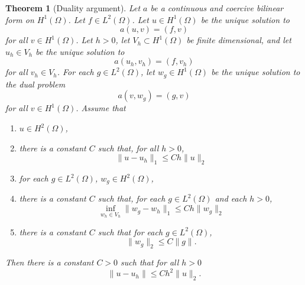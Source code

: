\documentclass{article}
\theoremstyle{plain}
\newtheorem{theorem}{Theorem}
\begin{document}
\begin{theorem}[Duality argument]
	Let $a$ be a continuous and coercive bilinear form on $H^1(\Omega)$.
	Let $f \in L^2(\Omega)$.
	Let $u \in H^1(\Omega)$ be the unique solution to
	\[a(u,v) = (f,v)\]
	for all $v\in H^1(\Omega)$.
	Let $h > 0$, let $V_h \subset H^1(\Omega)$ be finite dimensional, and let $u_h \in V_h$ be the unique solution to
	\[a(u_h,v_h) = (f,v_h)\]
	for all $v_h \in V_h$.
	For each $g \in L^2(\Omega)$, let $w_g \in H^1(\Omega)$ be the unique solution to the dual problem
	\[a(v,w_g) = (g,v)\]
	for all $v \in H^1(\Omega)$.
	Assume that
	\begin{enumerate}
		\item $u \in H^2(\Omega)$,
		\item there is a constant $C$ such that, for all $h > 0$,
		      \[\|u-u_h\|_1 \leq Ch\|u\|_2\]
		\item for each $g \in L^2(\Omega)$, $w_g \in H^2(\Omega)$,
		\item there is a constant $C$ such that, for each $g \in L^2(\Omega)$ and each $h > 0$,
		      \[\inf_{w_h \in V_h}\|w_g-w_h\|_1 \leq Ch\|w_g\|_2\]
		\item there is a constant $C$ such that for each $g \in L^2(\Omega)$,
		      \[\|w_g\|_2 \leq C\|g\|.\]
	\end{enumerate}
	Then there is a constant $C > 0$ such that for all $h > 0$
	\begin{equation}
		\|u-u_h\| \leq Ch^2\|u\|_2.
	\end{equation}
\end{theorem}
\end{document}
